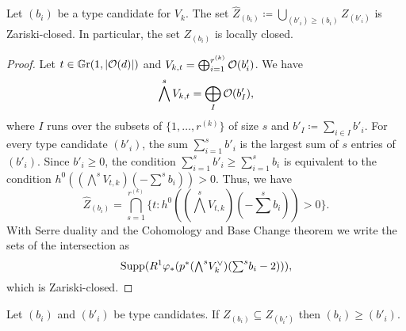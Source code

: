 \begin{proposition}
	Let $(b_i)$ be a type candidate for $V_k$. The set $\widehat Z_{(b_i)} \coloneqq \bigcup_{(b'_i)\geq(b_i)} Z_{(b'_i)}$ is Zariski-closed. In particular, the set $Z_{(b_i)}$ is locally closed.
\end{proposition}

\begin{proof}
Let $t\in \mathbb G \mathrm r(1,\lvert\mathcal{O}(d)\rvert)$ and $V_{k,t} = \bigoplus_{i=1}^{r^{(k)}} \mathcal{O}(b'_i)$. We have
\[
\bigwedge^s V_{k,t} = \bigoplus_{I} \mathcal{O}(b_I'),
\]
where $I$ runs over the subsets of $\{1,\dotsc, r^{(k)}\}$ of size $s$ and $b'_I\coloneqq \sum_{i\in I} b'_i$.
For every type candidate $(b'_i)$, the sum $\sum_{i=1}^s b'_i$ is the largest sum of $s$ entries of $(b'_i)$. Since $b'_i \geq 0$, the condition $\sum_{i=1}^s b'_i \geq \sum_{i=1}^s b_i$ is equivalent to the condition $h^0((\textstyle{\bigwedge}^{s} V_{t,k})(-\textstyle{\sum}^s b_i)) > 0$. Thus, we have
\[
	\widehat Z_{(b_i)} = \bigcap_{s=1}^{r^{(k)}} \{t : h^0((\textstyle{\bigwedge}^{s} V_{t,k})(-\textstyle{\sum}^s b_i)) > 0\}.
\]
With Serre duality and the Cohomology and Base Change theorem we write the sets of the intersection as 
\[
	\operatorname{Supp}(R^1 \varphi_{*} (p^{*} (\textstyle{\bigwedge}^{s} V_k^\vee )(\textstyle{\sum}^s b_i - 2))),
\]
which is Zariski-closed.
\end{proof}

\begin{corollary}
	Let $(b_i)$ and $(b'_i)$ be type candidates. If $Z_{(b_i)} \subseteq Z_{(b_i')}$ then $(b_i) \geq (b'_i)$.
\end{corollary}